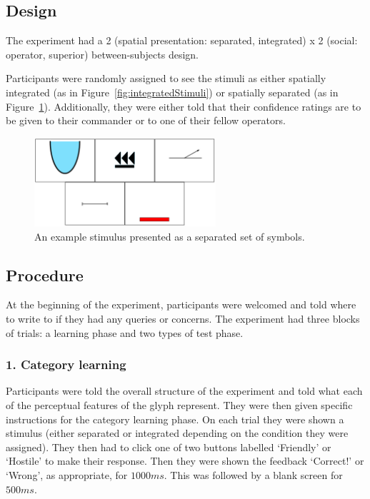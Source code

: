 \documentclass[doc, a4paper, apacite]{apa6}
\begin{document}
\subsection{Design}
The experiment had a 2 (spatial presentation: separated, integrated) x 2 (social: operator, superior) between-subjects design. 

Participants were randomly assigned to see the stimuli as either spatially integrated (as in Figure~\ref{fig:integratedStimuli}) or spatially separated (as in Figure~\ref{fig:separatedStimulus}). 
Additionally, they were either told that their confidence ratings are to be given to their commander or to one of their fellow operators. 

\begin{figure}[t]
	\centering	
	\includegraphics[width=0.6\textwidth]{images/separatedStimulusExample}
	\caption{An example stimulus presented as a separated set of symbols.}
	\label{fig:separatedStimulus}	
\end{figure}

\subsection{Procedure}
At the beginning of the experiment, participants were welcomed and told where to write to if they had any queries or concerns. 
The experiment had three blocks of trials: a learning phase and two types of test phase. 

\subsubsection{1. Category learning} 
Participants were told the overall structure of the experiment and told what each of the perceptual features of the glyph represent. 
They were then given specific instructions for the category learning phase. 
On each trial they were shown a stimulus (either separated or integrated depending on the condition they were assigned).
They then had to click one of two buttons labelled `Friendly' or `Hostile' to make their response.
Then they were shown the feedback `Correct!' or `Wrong', as appropriate, for $1000ms$.
This was followed by a blank screen for $500ms$.
\end{document}
